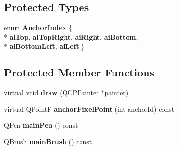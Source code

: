 \subsection*{Protected Types}
\begin{DoxyCompactItemize}
\item 
enum {\bfseries Anchor\+Index} \{ \\*
{\bfseries ai\+Top}, 
{\bfseries ai\+Top\+Right}, 
{\bfseries ai\+Right}, 
{\bfseries ai\+Bottom}, 
\\*
{\bfseries ai\+Bottom\+Left}, 
{\bfseries ai\+Left}
 \}\hypertarget{class_q_c_p_item_rect_af0ebba58e6bca4851c4db726691ec0d3}{}\label{class_q_c_p_item_rect_af0ebba58e6bca4851c4db726691ec0d3}

\end{DoxyCompactItemize}
\subsection*{Protected Member Functions}
\begin{DoxyCompactItemize}
\item 
virtual void {\bfseries draw} (\hyperlink{class_q_c_p_painter}{Q\+C\+P\+Painter} $\ast$painter)\hypertarget{class_q_c_p_item_rect_a18cd583638b876cdd50f1a155ec182aa}{}\label{class_q_c_p_item_rect_a18cd583638b876cdd50f1a155ec182aa}

\item 
virtual Q\+PointF {\bfseries anchor\+Pixel\+Point} (int anchor\+Id) const \hypertarget{class_q_c_p_item_rect_ae0973f8281fb52361b0c99ee899be07e}{}\label{class_q_c_p_item_rect_ae0973f8281fb52361b0c99ee899be07e}

\item 
Q\+Pen {\bfseries main\+Pen} () const \hypertarget{class_q_c_p_item_rect_afa0fb7c6328a1e197ecd537de36daf8f}{}\label{class_q_c_p_item_rect_afa0fb7c6328a1e197ecd537de36daf8f}

\item 
Q\+Brush {\bfseries main\+Brush} () const \hypertarget{class_q_c_p_item_rect_ab0bd8e272e822ec851ba5b0c20e9200e}{}\label{class_q_c_p_item_rect_ab0bd8e272e822ec851ba5b0c20e9200e}

\end{DoxyCompactItemize}

